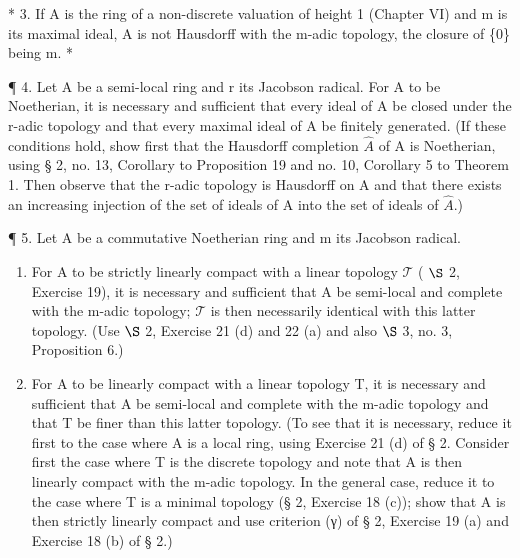 * 3. If A is the ring of a non-discrete valuation of height 1 (Chapter VI) and m is its maximal ideal, A is not Hausdorff with the m-adic topology, the closure of \{0\} being m. *

¶ 4. Let A be a semi-local ring and r its Jacobson radical. For A to be Noetherian, it is necessary and sufficient that every ideal of A be closed under the r-adic topology and that every maximal ideal of A be finitely generated. (If these conditions hold, show first that the Hausdorff completion \(\hat{A}\) of A is Noetherian, using § 2, no. 13, Corollary to Proposition 19 and no. 10, Corollary 5 to Theorem 1. Then observe that the r-adic topology is Hausdorff on A and that there exists an increasing injection of the set of ideals of A into the set of ideals of \(\hat{A}\).)

¶ 5. Let A be a commutative Noetherian ring and m its Jacobson radical.

\begin{enumerate}
\def\labelenumi{(\alph{enumi})}
\item
  For A to be strictly linearly compact with a linear topology \(\mathcal{T}\) ( \(\S\) 2, Exercise 19), it is necessary and sufficient that A be semi-local and complete with the m-adic topology; \(\mathcal{T}\) is then necessarily identical with this latter topology. (Use \(\S\) 2, Exercise 21 (d) and 22 (a) and also \(\S\) 3, no. 3, Proposition 6.)
\item
  For A to be linearly compact with a linear topology T, it is necessary and sufficient that A be semi-local and complete with the m-adic topology and that T be finer than this latter topology. (To see that it is necessary, reduce it first to the case where A is a local ring, using Exercise 21 (d) of § 2. Consider first the case where T is the discrete topology and note that A is then linearly compact with the m-adic topology. In the general case, reduce it to the case where T is a minimal topology (§ 2, Exercise 18 (c)); show that A is then strictly linearly compact and use criterion (γ) of § 2, Exercise 19 (a) and Exercise 18 (b) of § 2.)
\end{enumerate}


